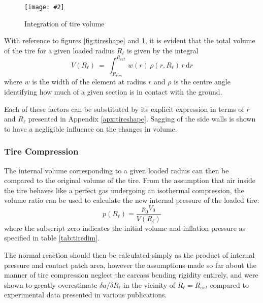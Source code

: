 \documentclass[12pt,a4paper]{report}
\newcommand{\figura}[5][htbp]{
\begin{figure}[#1]
\begin{center}
\texttt{[image: \#2]}
\caption{#4}\label{#5}
\end{center}
\end{figure}
}
\begin{document}
\figura{piczero.jpg}{}{Integration of tire volume}{fig:tirecut}

With reference to figures \ref{fig:tireshape} and \ref{fig:tirecut}, it is evident that the total volume of the tire for a given loaded radius $R_\ell$
is given by the integral
\begin{equation}\label{eqn:vol1}
V(R_\ell)\: = \:\int_{R_{rim}}^{R_{ext}} w(r)\, \rho(r,R_\ell) \, r\, \mathrm{d}r
\end{equation}
where $w$ is the width of the element at radius $r$ and $\rho$ is the centre angle identifying how much of a given section is in contact with the ground. 

Each of these factors can be substituted by its explicit expression in terms of $r$ and $R_\ell$ presented in Appendix \ref{apx:tireshape}.
Sagging of the side walls is shown to have a negligible influence on the changes in volume.

\subsubsection*{Tire Compression}
The internal volume corresponding to a given loaded radius can then be compared to the original volume of the tire. From the assumption that air inside the tire behaves like a perfect gas undergoing an isothermal compression, the volume ratio can be used to calculate the new internal pressure of the loaded tire:
\begin{equation} \label{eqn:tirepres}
p(R_\ell) = \frac{p_0 V_0}{V(R_\ell)}
\end{equation}
where the subscript zero indicates the initial volume and inflation pressure as specified in table \ref{tab:tiredim}. %

The normal reaction should then be calculated simply as the product of internal pressure and contact patch area, however the assumptions made so far about the manner of tire compression neglect the carcass bending rigidity entirely, and were shown to greatly overestimate $\delta a / \delta R_\ell$ in the vicinity of $R_\ell = R_{ext}$ compared to experimental data presented in various publications.
\end{document}
